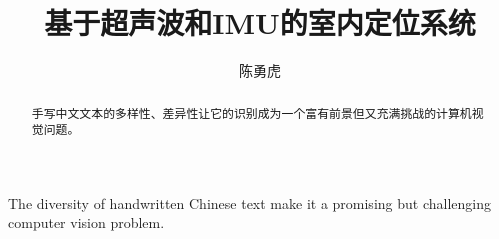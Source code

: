 \documentclass[winfonts]{njuthesis}
\title{基于超声波和IMU的室内定位系统}
\author{陈勇虎}
\begin{document}
\maketitle
\controlpage %

\begin{abstract}


手写中文文本的多样性、差异性让它的识别成为一个富有前景但又充满挑战的计算机视觉问题。

\end{abstract}

\begin{englishabstract}
The diversity of handwritten Chinese text make it a promising but challenging computer vision problem. 
\end{englishabstract}

%
%
%
%

\tableofcontents



\mainmatter
\end{document}

